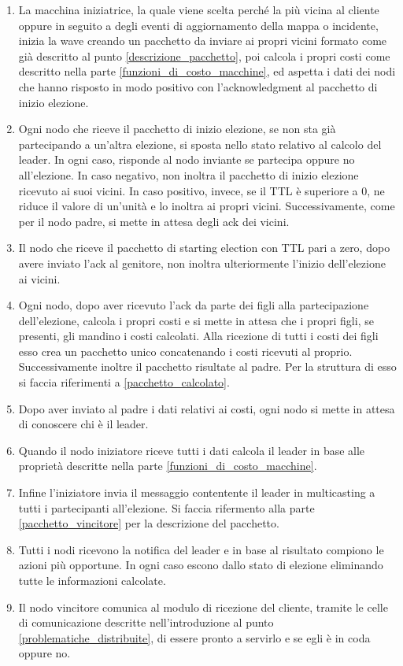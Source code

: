 \begin{enumerate}
	\item La macchina iniziatrice, la quale viene scelta perché la più vicina al cliente oppure in seguito a degli eventi di aggiornamento della mappa o incidente, inizia la wave creando un pacchetto da inviare ai propri vicini formato come già descritto al punto \ref{descrizione_pacchetto}, poi calcola i propri costi come descritto nella parte \ref{funzioni_di_costo_macchine}, ed aspetta i dati dei nodi che hanno risposto in modo positivo con l'acknowledgment al pacchetto di inizio elezione.
	\item Ogni nodo che riceve il pacchetto di inizio elezione, se non sta già partecipando a un'altra elezione, si sposta nello stato relativo al calcolo del leader. In ogni caso, risponde al nodo inviante se partecipa oppure no all'elezione. In caso negativo, non inoltra il pacchetto di inizio elezione ricevuto ai suoi vicini. In caso positivo, invece, se il TTL è superiore a 0, ne riduce il valore di un'unità e lo inoltra ai propri vicini. Successivamente, come per il nodo padre, si mette in attesa degli ack dei vicini.
	\item Il nodo che riceve il pacchetto di starting election con TTL pari a zero, dopo avere inviato l'ack al genitore, non inoltra ulteriormente l'inizio dell'elezione ai vicini.
	\item Ogni nodo, dopo aver ricevuto l'ack da parte dei figli alla partecipazione dell'elezione, calcola i propri costi e si mette in attesa che i propri figli, se presenti, gli mandino i costi calcolati. Alla ricezione di tutti i costi dei figli esso crea un pacchetto unico concatenando i costi ricevuti al proprio. Successivamente inoltre il pacchetto risultate al padre. Per la struttura di esso si faccia riferimenti a \ref{pacchetto_calcolato}.
	\item Dopo aver inviato al padre i dati relativi ai costi, ogni nodo si mette in attesa di conoscere chi è il leader.
	\item Quando il nodo iniziatore riceve tutti i dati calcola il leader in base alle proprietà descritte nella parte \ref{funzioni_di_costo_macchine}. 
	\item Infine l'iniziatore invia il messaggio contentente il leader in multicasting a tutti i partecipanti all'elezione. Si faccia rifermento alla parte \ref{pacchetto_vincitore} per la descrizione del pacchetto.
	\item Tutti i nodi ricevono la notifica del leader e in base al risultato compiono le azioni più opportune. In ogni caso escono dallo stato di elezione eliminando tutte le informazioni calcolate.
	\item Il nodo vincitore comunica al modulo di ricezione del cliente, tramite le celle di comunicazione descritte nell'introduzione al punto \ref{problematiche_distribuite}, di essere pronto a servirlo e se egli è in coda oppure no.
\end{enumerate}

